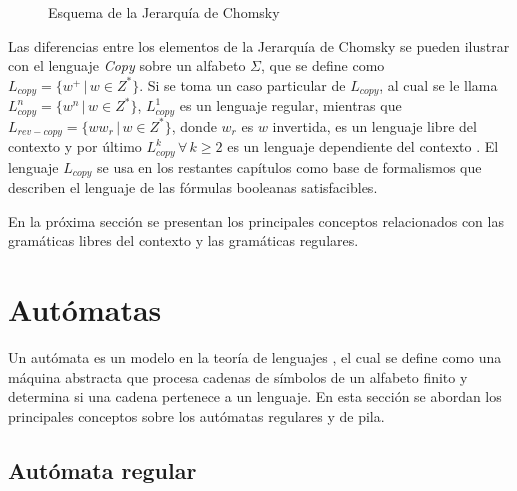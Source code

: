 \documentclass[12pt]{article}
\begin{document}
\begin{figure}
      \centering
      \caption{Esquema de la Jerarquía de Chomsky}
      \label{fig:ChomskySchema} %
\end{figure}

Las diferencias entre los elementos de la Jerarquía de Chomsky se pueden ilustrar con el lenguaje \textit{Copy}
sobre un alfabeto $\Sigma$, que se define como $L_{copy}=\{w^+\,|\,w\in Z^*\}$.  Si se toma un caso particular 
de $L_{copy}$, al cual se le llama $L_{copy}^n=\{w^n\,|\,w\in Z^*\}$, $L_{copy}^1$ es un lenguaje regular, 
mientras que $L_{rev-copy}=\{ww_r\,|\,w\in Z^*\}$, donde $w_r$ es $w$ invertida, es un lenguaje libre del contexto y por último $L_{copy}^k\,\forall\,k\geq 2$ es un lenguaje dependiente del contexto \cite{authomataTheory}. 
El lenguaje $L_{copy}$ se usa en los restantes capítulos como base de formalismos que describen el lenguaje de las fórmulas booleanas satisfacibles.

En la próxima sección se presentan los principales conceptos relacionados con las gramáticas libres del contexto y las 
gramáticas regulares. 

\section{Autómatas}
Un autómata es un modelo en la teoría de lenguajes \cite{authomataTheory}, el cual se define como una máquina 
abstracta que procesa cadenas de símbolos de un alfabeto finito y determina si una cadena pertenece a un lenguaje. 
En esta sección se abordan los principales conceptos sobre los autómatas regulares y de pila.
\subsection{Autómata regular}
\end{document}
